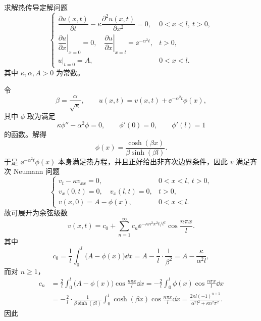 \begin{question}[第2题]

求解热传导定解问题
\[
\begin{cases}
\dfrac{\partial u(x, t)}{\partial t}-\kappa \dfrac{\partial^{2} u(x, t)}{\partial x^{2}}=0, & 0<x<l,\ t>0,\\
\left.\dfrac{\partial u}{\partial x}\right|_{x=0}=0,\quad \left.\dfrac{\partial u}{\partial x}\right|_{x=l}=\ee^{-\alpha^{2} t}, & t>0,\\
\left.u\right|_{t=0}=A, & 0<x<l.
\end{cases}
\]
其中 $\kappa,\alpha,A>0$ 为常数。

\begin{solution}

令
\[
\beta=\frac{\alpha}{\sqrt{\kappa}},\qquad
u(x,t)=v(x,t)+\ee^{-\alpha^2 t}\phi(x),
\]
其中 $\phi$ 取为满足
\[
\kappa\phi''-\alpha^2\phi=0,\qquad \phi'(0)=0,\qquad \phi'(l)=1
\]
的函数。解得
\[
\phi(x)=\frac{\cosh(\beta x)}{\beta\sinh(\beta l)}.
\]
于是 $\ee^{-\alpha^2 t}\phi(x)$ 本身满足热方程，并且正好给出非齐次边界条件，因此 $v$ 满足齐次 Neumann 问题
\[
\begin{cases}
 v_t-\kappa v_{xx}=0, & 0<x<l,\ t>0,\\
 v_x(0,t)=0,\quad v_x(l,t)=0, & t>0,\\
 v(x,0)=A-\phi(x), & 0<x<l.
\end{cases}
\]
故可展开为余弦级数
\[
v(x,t)=c_0+\sum_{n=1}^{\infty}c_n \ee^{-\kappa n^2\pi^2 t/l^2}\cos\frac{n\pi x}{l}.
\]
其中
\[
c_0=\frac1l\int_0^l\bigl(A-\phi(x)\bigr)\dd{x}
=A-\frac1l\cdot\frac{1}{\beta^2}
=A-\frac{\kappa}{\alpha^2 l},
\]
而对 $n\ge 1$，
\[
\begin{aligned}
c_n
&=\frac{2}{l}\int_0^l\bigl(A-\phi(x)\bigr)\cos\frac{n\pi x}{l}\dd{x}
=-\frac{2}{l}\int_0^l\phi(x)\cos\frac{n\pi x}{l}\dd{x}\\
&=-\frac{2}{l}\cdot\frac{1}{\beta\sinh(\beta l)}
\int_0^l \cosh(\beta x)\cos\frac{n\pi x}{l}\dd{x}
=\frac{2\kappa l(-1)^{n+1}}{\alpha^2 l^2+\kappa n^2\pi^2}.
\end{aligned}
\]
因此

\end{solution}
\end{question}

